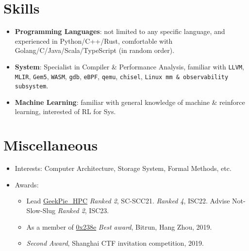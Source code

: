 \documentclass{resume}
\newcommand{\en}[1]{#1}
\newcommand{\zh}[1]{}
\begin{document}
\section{\en{Skills}\zh{技能}}
\begin{itemize}[parsep=0.25ex]
      \item \en{\textbf{Programming Languages}:
                  not limited to any specific language,
                  and experienced in Python/C++/Rust,
                  comfortable with Golang/C/Java/Scala/TypeScript (in random order).}
            \zh{\textbf{编程语言}:
                  不局限于特定编程语言，且尤其熟悉 Python/C++/Rust 等，
                  了解 Golang/C/Java/Scala/TypeScript 等。}

      \item \en{\textbf{System}:
                  Specialist in Compiler \& Performance Analysis, familiar with \texttt{LLVM}, \texttt{MLIR}, \texttt{Gem5}, \texttt{WASM}, \texttt{gdb}, \texttt{eBPF}, \texttt{qemu}, \texttt{chisel}, \texttt{Linux mm \& observability subsystem}.}
            \zh{\textbf{系统}:
                  熟悉各种CPU，编译器及操作系统内核的概念与设计，熟悉各种内核性能调优工具，例如\texttt{LLVM}, \texttt{MLIR}, \texttt{Gem5}, \texttt{WASM}, \texttt{gdb}, \texttt{eBPF}, \texttt{qemu}, \texttt{chisel}, \texttt{Linux mm \& observability 子系统}。}

      \item \en{\textbf{Machine Learning}:
                  familiar with general knowledge of machine \& reinforce learning, interested of RL for Sys.}
            \zh{\textbf{机器学习}:
                  熟悉经典机器与强化学习算法，对RL for System有兴趣。}
\end{itemize}

\section{\en{Miscellaneous}\zh{其他}}
\begin{itemize}
      \item \en{Interests: Computer Architecture, Storage System, Formal Methods, etc.}
            \zh{兴趣：高性能计算、体系结构、存储、形式化验证安全等。}
      \item \en{Awards:}
      \zh{所获奖项：}
      \begin{itemize}
      \item \en{Lead \href{https://hpc.geekpie.club}{GeekPie\_HPC} \textit{Ranked 2}, SC-SCC21. \textit{Ranked 4}, ISC22. Advise Not-Slow-Slug \textit{Ranked 2}, ISC23.}
            \zh{带领\href{https://hpc.geekpie.club}{GeekPie\_HPC} SCC21 团队第2名，ISC22 团队第4名，指导 Not-Slow-Slug 团队 ISC23 团队第2名。}
      \item \en{As a member of \href{https://github.com/0x238e/Vchain}{0x238e} \textit{Best award}, Bitrun, Hang Zhou, 2019.}
            \zh{带领\href{https://github.com/0x238e/Vchain}{0x238e} Bitrun Hackathon 比赛最佳奖}
      \item \en{\textit{Second Award}, Shanghai CTF invitation competition, 2019.}
            \zh{上海2019年 CTF 邀请赛比赛二等奖}
      \end{itemize}
\end{itemize}
\end{document}
